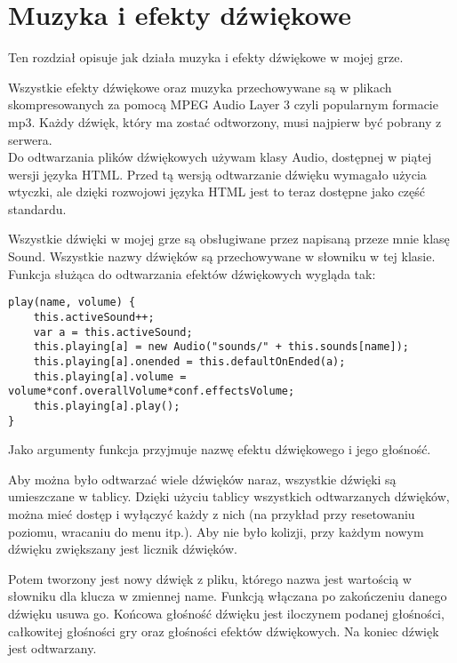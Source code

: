 \chapter{Muzyka i efekty dźwiękowe}
\thispagestyle{chapterBeginStyle}
\label{ch:music}

Ten rozdział opisuje jak działa muzyka i efekty dźwiękowe w mojej grze.\vspace{10pt}\\
\smallskip

Wszystkie efekty dźwiękowe oraz muzyka przechowywane są w plikach skompresowanych za pomocą MPEG Audio Layer 3 czyli popularnym formacie mp3. Każdy dźwięk, który ma zostać odtworzony, musi najpierw być pobrany z serwera.\\

Do odtwarzania plików dźwiękowych używam klasy Audio, dostępnej w piątej wersji języka HTML. Przed tą wersją odtwarzanie dźwięku wymagało użycia wtyczki, ale dzięki rozwojowi języka HTML jest to teraz dostępne jako czę\'sć standardu.\\

\smallskip

Wszystkie dźwięki w mojej grze są obsługiwane przez napisaną przeze mnie klasę Sound. Wszystkie nazwy dźwięków są przechowywane w słowniku w tej klasie. Funkcja służąca do odtwarzania efektów dźwiękowych wygląda tak:
\begin{lstlisting}
play(name, volume) {
	this.activeSound++;
	var a = this.activeSound;
	this.playing[a] = new Audio("sounds/" + this.sounds[name]);
	this.playing[a].onended = this.defaultOnEnded(a);
	this.playing[a].volume = volume*conf.overallVolume*conf.effectsVolume;
	this.playing[a].play();
}
\end{lstlisting}
Jako argumenty funkcja przyjmuje nazwę efektu dźwiękowego i jego gło\'sno\'sć.

Aby można było odtwarzać wiele dźwięków naraz, wszystkie dźwięki są umieszczane w tablicy. Dzięki użyciu tablicy wszystkich odtwarzanych dźwięków, można mieć dostęp i wyłączyć każdy z nich (na przykład przy resetowaniu poziomu, wracaniu do menu itp.). Aby nie było kolizji, przy każdym nowym dźwięku zwiększany jest licznik dźwięków.

Potem tworzony jest nowy dźwięk z pliku, którego nazwa jest warto\'scią w słowniku dla klucza w zmiennej name. Funkcją włączana po zakończeniu danego dźwięku usuwa go. Końcowa gło\'sno\'sć dźwięku jest iloczynem podanej gło\'sno\'sci, całkowitej gło\'sno\'sci gry oraz gło\'sno\'sci efektów dźwiękowych. Na koniec dźwięk jest odtwarzany.\newpage

